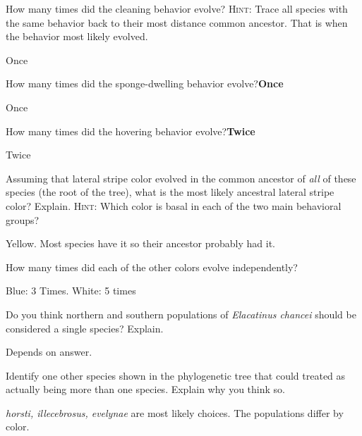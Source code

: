 \documentclass[12pt, hidelinks]{exam}
\newcommand*\AnswerBox[2]{%
    \parbox[t][#1]{0.92\textwidth}{%
    \begin{solution}#2\end{solution}}
    \vspace{\stretch{1}}
}
\begin{document}
\begin{questions}

\question
How many times did the cleaning behavior evolve? \textsc{Hint:} 
Trace all species with the same behavior back to their most distance common ancestor.
That is when the behavior most likely evolved. 

\AnswerBox{\baselineskip}{Once}

\question
How many times did the sponge-dwelling behavior evolve?\ifprintanswers\quad\textbf{Once}\fi

\AnswerBox{\baselineskip}{Once}

\question
How many times did the hovering behavior evolve?\ifprintanswers\quad\textbf{Twice}\fi

\AnswerBox{\baselineskip}{Twice}

\question
Assuming that lateral stripe color evolved in the common ancestor
of \emph{all} of these species (the root of the tree), what is the most likely ancestral lateral
stripe color? Explain. \textsc{Hint:} Which color is basal in each of the two main behavioral groups?

\AnswerBox{3\baselineskip}{Yellow. Most species have it so their ancestor probably had it.}

\question
How many times did each of the other colors evolve independently?

\AnswerBox{2\baselineskip}{Blue: 3 Times. \quad White: 5 times}


\question
Do you think northern and southern populations of 
\textit{Elacatinus chancei} should be considered a single species?
Explain.

\AnswerBox{3\baselineskip}{Depends on answer.}

\question
Identify one other species shown in the phylogenetic tree
that could treated as actually being more than one species. Explain why you think so.

\AnswerBox{3\baselineskip}{\textit{horsti, illecebrosus, evelynae} are most likely choices. 
The populations differ by color.}

%
%

\end{questions}
\end{document}
